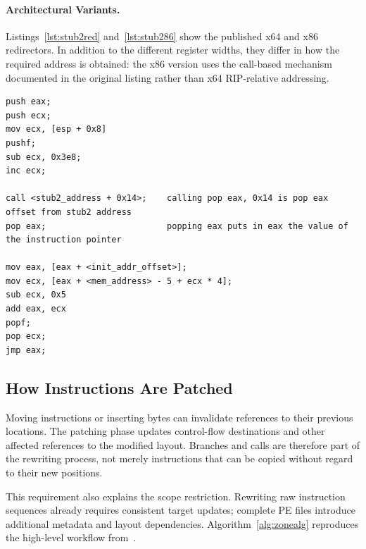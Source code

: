 \documentclass[runningheads]{llncs}
\begin{document}
\paragraph{Architectural Variants.}
Listings~\ref{lst:stub2red} and~\ref{lst:stub286} show the published x64 and x86 redirectors. In addition to the different register widths, they differ in how the required address is obtained: the x86 version uses the call-based mechanism documented in the original listing rather than x64 RIP-relative addressing.

\begin{lstlisting}[label={lst:stub286},language={[x86masm]Assembler}, basicstyle=\scriptsize\ttfamily, caption={x86 redirector. Reproduced from Listing~4 of~\cite{zone_secrypt_2026}.}]
push eax;
push ecx;
mov ecx, [esp + 0x8]
pushf;
sub ecx, 0x3e8;
inc ecx;

call <stub2_address + 0x14>;    calling pop eax, 0x14 is pop eax offset from stub2 address
pop eax;                        popping eax puts in eax the value of the instruction pointer

mov eax, [eax + <init_addr_offset>];
mov ecx, [eax + <mem_address> - 5 + ecx * 4];
sub ecx, 0x5
add eax, ecx
popf;
pop ecx;
jmp eax;
\end{lstlisting}

\subsection{How Instructions Are Patched}\label{sec:instr_patch}

Moving instructions or inserting bytes can invalidate references to their previous locations. The patching phase updates control-flow destinations and other affected references to the modified layout. Branches and calls are therefore part of the rewriting process, not merely instructions that can be copied without regard to their new positions.

This requirement also explains the scope restriction. Rewriting raw instruction sequences already requires consistent target updates; complete PE files introduce additional metadata and layout dependencies. Algorithm~\ref{alg:zonealg} reproduces the high-level workflow from~\cite{zone_secrypt_2026}.
\end{document}

